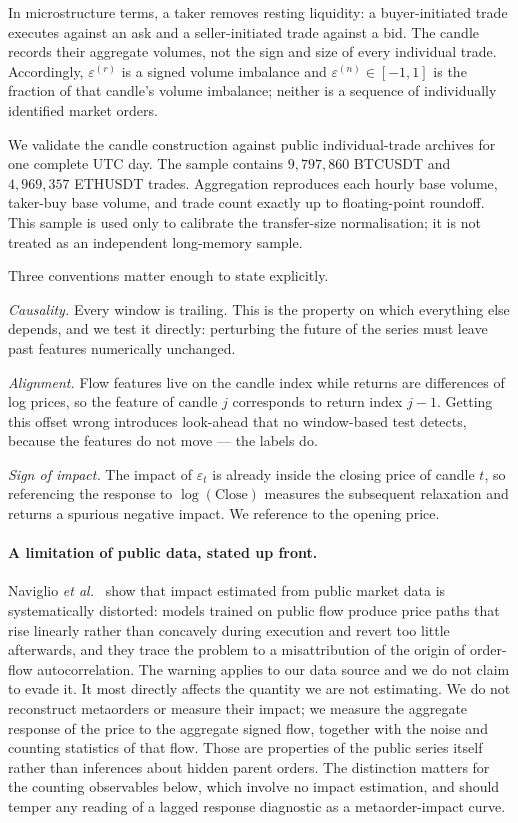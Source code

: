 \documentclass[aps,pre,twocolumn,superscriptaddress,floatfix,nofootinbib]{revtex4-2}
\newcommand{\eps}{\varepsilon}
\begin{document}
In microstructure terms, a taker removes resting liquidity: a buyer-initiated
trade executes against an ask and a seller-initiated trade against a bid. The
candle records their aggregate volumes, not the sign and size of every
individual trade. Accordingly, $\eps^{(r)}$ is a signed volume imbalance and
$\eps^{(n)}\in[-1,1]$ is the fraction of that candle's volume imbalance; neither
is a sequence of individually identified market orders.

We validate the candle construction against public individual-trade archives
for one complete UTC day. The sample contains $9{,}797{,}860$ BTCUSDT and
$4{,}969{,}357$ ETHUSDT trades. Aggregation reproduces each hourly base volume,
taker-buy base volume, and trade count exactly up to floating-point roundoff.
This sample is used only to calibrate the transfer-size normalisation; it is not
treated as an independent long-memory sample.

Three conventions matter enough to state explicitly.

\emph{Causality.} Every window is trailing. This is the property on which
everything else depends, and we test it directly: perturbing the future of the
series must leave past features numerically unchanged.

\emph{Alignment.} Flow features live on the candle index while returns are
differences of log prices, so the feature of candle $j$ corresponds to return
index $j-1$. Getting this offset wrong introduces look-ahead that no
window-based test detects, because the features do not move --- the labels do.

\emph{Sign of impact.} The impact of $\eps_t$ is already inside the closing
price of candle $t$, so referencing the response to $\log(\text{Close})$
measures the subsequent relaxation and returns a spurious negative impact. We
reference to the opening price.

\paragraph*{A limitation of public data, stated up front.}
Naviglio \textit{et al.}\ \cite{naviglio2025} show that impact estimated from
public market data is systematically distorted: models trained on public flow
produce price paths that rise linearly rather than concavely during execution
and revert too little afterwards, and they trace the problem to a
misattribution of the origin of order-flow autocorrelation. The warning applies
to our data source and we do not claim to evade it. It most directly affects
the quantity we are not estimating. We do not reconstruct
metaorders or measure their impact; we measure the aggregate response of the
price to the aggregate signed flow, together with the noise and counting
statistics of that flow. Those are properties of the public series itself
rather than inferences about hidden parent orders. The distinction matters for
the counting observables below, which involve no impact estimation, and should
temper any reading of a lagged response diagnostic as a metaorder-impact curve.
\end{document}
